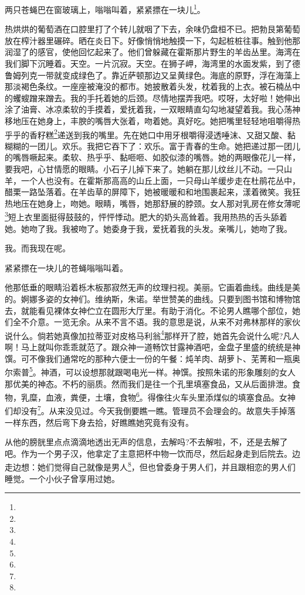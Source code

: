 \par 两只苍蝇巴在窗玻璃上，嗡嗡叫着，紧紧摽在一块儿\footnote{}。
\par 热烘烘的葡萄酒在口腔里打了个转儿就咽了下去，余味仍盘桓不已。把勃艮第葡萄放在榨汁器里碾碎。晒在炎日下。好像悄悄地触摸一下，勾起桩桩往事。触到他那润湿了的感官，使他回忆起来了。他们曾躲藏在霍斯那片野生的羊齿丛里。海湾在我们脚下沉睡着。天空。一片沉寂。天空。在狮子岬，海湾里的水面发紫，到了德鲁姆列克一带就变成绿色了。靠近萨顿那边又呈黄绿色。海底的原野，浮在海藻上那淡褐色条纹。一座座被淹没的都市。她披散着头发，枕着我的上衣。被石楠丛中的蠼螋蹭来蹭去。我的手托着她的后颈。尽情地摆弄我吧。哎呀，太好啦！她伸出涂了油膏、冰凉柔软的手摸着，爱抚着我，一双眼睛直勾勾地凝望着我。我心荡神移地压在她身上，丰腴的嘴唇大张着，吻着她。真好吃。她把嘴里轻轻地咀嚼得热乎乎的香籽糕\footnote{}递送到我的嘴里。先在她口中用牙根嚼得浸透唾沫、又甜又酸、黏糊糊的一团儿。欢乐。我把它吞下了：欢乐。富于青春的生命。她把递过那一团儿的嘴唇噘起来。柔软、热乎乎、黏咂咂、如胶似漆的嘴唇。她的两眼像花儿一样，要我吧，心甘情愿的眼睛。小石子儿掉下来了。她躺在那儿纹丝儿不动。一只山羊，一个人也没有。在霍斯那高高的山丘上面，一只母山羊缓步走在杜鹃花丛中，醋栗一路坠落着。在羊齿草的屏障下，她被暖暖和和地围裹起来，漾着微笑。我狂热地压在她身上，吻她。眼睛，嘴唇，她那舒展的脖颈。女人那对乳房在修女薄呢\footnote{}短上衣里面挺得鼓鼓的，怦怦悸动。肥大的奶头高耸着。我用热热的舌头舔着她。她吻了我。我被吻了。她委身于我，爱抚着我的头发。亲嘴儿，她吻了我。
\par 我。而我现在呢。
\par 紧紧摽在一块儿的苍蝇嗡嗡叫着。
\par 他那低垂的眼睛沿着栎木板那寂然无声的纹理扫视。美丽。它画着曲线。曲线是美的。婀娜多姿的女神们。维纳斯，朱诺。举世赞美的曲线。只要到图书馆和博物馆去，就能看见裸体女神伫立在圆形大厅里。有助于消化。不论男人瞧哪个部位，她们全不介意。一览无余。从来不言不语。我的意思是说，从来不对弗林那样的家伙说什么。倘若她真像加拉蒂亚对皮格马利翁\footnote{}那样开了腔，她首先会说什么呢?凡人啊！马上就叫你乖乖就范了。跟众神一道畅饮甘露神酒吧，金盘子里盛的统统是神馔。可不像我们通常吃的那种六便士一份的午餐：炖羊肉、胡萝卜、芜菁和一瓶奥尔索普\footnote{}。神酒，可以设想那就跟喝电光一样。神馔。按照朱诺的形象雕刻的女人那优美的神态。不朽的丽质。然而我们是往一个孔里填塞食品，又从后面排泄。食物，乳糜，血液，粪便，土壤，食物\footnote{}。得像往火车头里添煤似的填塞食品。女神们却没有\footnote{}。从来没见过。今天我倒要瞧一瞧。管理员不会理会的。故意失手掉落一样东西，然后弯下身去拾，好瞧瞧她究竟有没有。
\par 从他的膀胱里点点滴滴地透出无声的信息，去解吗?不去解啦，不，还是去解了吧。作为一个男子汉，他拿定了主意把杯中物一饮而尽，然后起身走到后院去。边走边想：她们觉得自己就像是男人\footnote{}，但也曾委身于男人们，并且跟相恋的男人们睡觉。一个小伙子曾享用过她。
